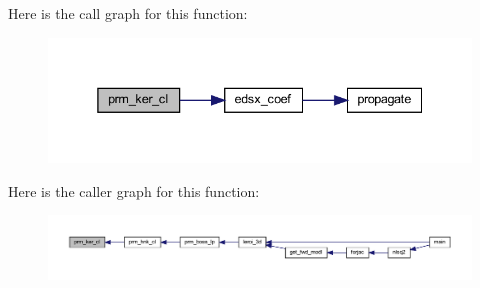 Here is the call graph for this function\+:\nopagebreak
\begin{figure}[H]
\begin{center}
\leavevmode
\includegraphics[width=338pt]{Leroi_8f90_a04185f4ba85efc3e493f2de9019a69da_cgraph}
\end{center}
\end{figure}
Here is the caller graph for this function\+:\nopagebreak
\begin{figure}[H]
\begin{center}
\leavevmode
\includegraphics[width=350pt]{Leroi_8f90_a04185f4ba85efc3e493f2de9019a69da_icgraph}
\end{center}
\end{figure}
\mbox{\label{Leroi_8f90_a54994b19439ad9ea5bfc96a902101c44}} 
